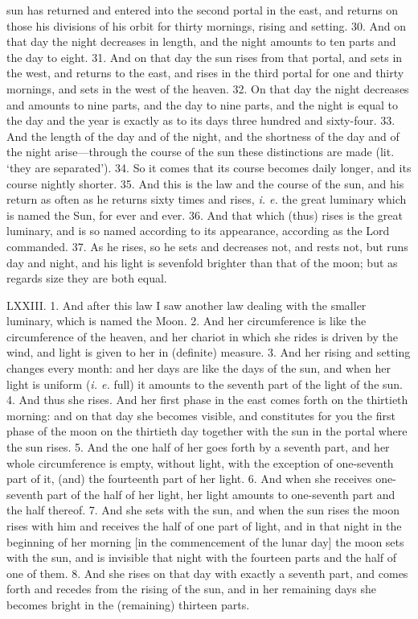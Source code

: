 sun has returned and entered into the second portal
in the east, and returns on those his divisions of his
orbit for thirty mornings, rising and setting. 30.
And on that day the night decreases in length, and
the night amounts to ten parts and the day to eight.
31. And on that day the sun rises from that portal,
and sets in the west, and returns to the east, and rises
in the third portal for one and thirty mornings, and
sets in the west of the heaven. 32. On that day the
night decreases and amounts to nine parts, and the
day to nine parts, and the night is equal to the day
and the year is exactly as to its days three hundred
and sixty-four. 33. And the length of the day and
of the night, and the shortness of the day and of the
night arise—through the course of the sun these
distinctions are made (lit. ‘they are separated’).
34. So it comes that its course becomes daily longer,
and its course nightly shorter. 35. And this is the
law and the course of the sun, and his return as often
as he returns sixty times and rises, \emph{i. e.} the great
luminary which is named the Sun, for ever and ever.
36. And that which (thus) rises is the great luminary,
and is so named according to its appearance, according
as the Lord commanded. 37. As he rises, so he sets
and decreases not, and rests not, but runs day and
night, and his light is sevenfold brighter than that of
the moon; but as regards size they are both equal.


LXXIII. 1. And after this law I saw another law
dealing with the smaller luminary, which is named
the Moon. 2. And her circumference is like the
circumference of the heaven, and her chariot in which
she rides is driven by the wind, and light is given to
her in (definite) measure. 3. And her rising and
setting changes every month: and her days are like
the days of the sun, and when her light is uniform
(\emph{i. e.} full) it amounts to the seventh part of the light
of the sun. 4. And thus she rises. And her first
phase in the east comes forth on the thirtieth morning:
and on that day she becomes visible, and constitutes
for you the first phase of the moon on the thirtieth
day together with the sun in the portal where the sun
rises. 5. And the one half of her goes forth by a
seventh part, and her whole circumference is empty,
without light, with the exception of one-seventh part
of it, (and) the fourteenth part of her light. 6. And
when she receives one-seventh part of the half of her
light, her light amounts to one-seventh part and the
half thereof. 7. And she sets with the sun, and when
the sun rises the moon rises with him and receives
the half of one part of light, and in that night in the
beginning of her morning [in the commencement of
the lunar day] the moon sets with the sun, and is
invisible that night with the fourteen parts and the
half of one of them. 8. And she rises on that day
with exactly a seventh part, and comes forth and
recedes from the rising of the sun, and in her remaining
days she becomes bright in the (remaining)
thirteen parts.

